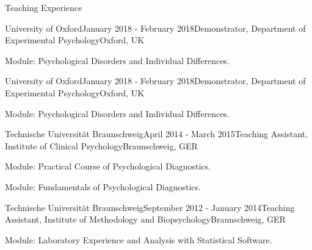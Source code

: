 \documentclass{resume} %
\begin{document}


\begin{rSection}{Teaching Experience}

\begin{rSubsection}{University of Oxford}{January 2018 - February 2018}{Demonstrator, Department of Experimental Psychology}{Oxford, UK}
\item Module: Psychological Disorders and Individual Differences.
\end{rSubsection}

\begin{rSubsection}{University of Oxford}{January 2018 - February 2018}{Demonstrator, Department of Experimental Psychology}{Oxford, UK}
\item Module: Psychological Disorders and Individual Differences.
\end{rSubsection}

\begin{rSubsection}{Technische Universit{\"a}t Braunschweig}{April 2014 - March 2015}{Teaching Assistant, Institute of Clinical Psychology}{Braunschweig, GER}
\item Module: Practical Course of Psychological Diagnostics.
\item Module: Fundamentals of Psychological Diagnostics.
\end{rSubsection}

\begin{rSubsection}{Technische Universit{\"a}t Braunschweig}{September 2012 - January 2014}{Teaching Assistant, Institute of Methodology and Biopsychology}{Braunschweig, GER}
\item Module: Laboratory Experience and Analysis with Statistical Software.
\end{rSubsection}

\end{rSection}

\end{document}
